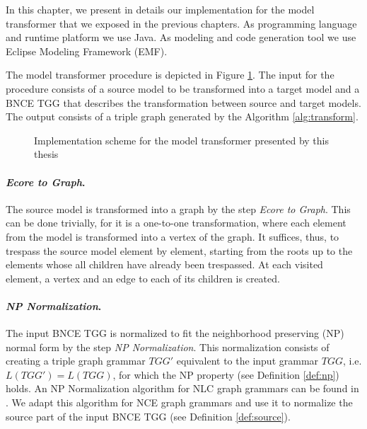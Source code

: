 In this chapter, we present in details our implementation for the model transformer that we exposed in the previous chapters. As programming language and runtime platform we use Java. As modeling and code generation tool we use Eclipse Modeling Framework (EMF).

The model transformer procedure is depicted in Figure \ref{fig:implementation-scheme}. The input for the procedure consists of a source model to be transformed into a target model and a BNCE TGG that describes the transformation between source and target models. The output consists of a triple graph generated by the Algorithm \ref{alg:transform}.

\begin{figure}[h]
	
	\caption{Implementation scheme for the model transformer presented by this thesis}
	\label{fig:implementation-scheme}
\end{figure}

\paragraph*{\emph{Ecore to Graph}.} The source model is transformed into a graph by the step \emph{Ecore to Graph}. This can be done trivially, for it is a one-to-one transformation, where each element from the model is transformed into a vertex of the graph. It suffices, thus, to trespass the source model element by element, starting from the roots up to the elements whose all children have already been trespassed. At each visited element, a vertex and an edge to each of its children is created.

\paragraph*{\emph{NP Normalization}.} The input BNCE TGG is normalized to fit the neighborhood preserving (NP) normal form by the step \emph{NP Normalization}. This normalization consists of creating a triple graph grammar $TGG'$ equivalent to the input grammar $TGG$, i.e. $L(TGG') = L(TGG)$, for which the NP property (see Definition \ref{def:np}) holds. An NP Normalization algorithm for NLC graph grammars can be found in \citep{rozenberg1986boundary}. We adapt this algorithm for NCE graph grammars and use it to normalize the source part of the input BNCE TGG (see Definition \ref{def:source}).

